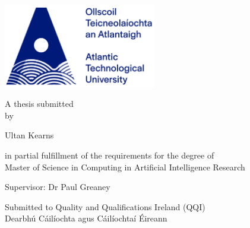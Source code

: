 \documentclass[a4paper,11pt]{report}
\begin{document}
\begin{titlepage}
    \begin{center}

    \vspace{30pt}
    \includegraphics[width=0.5\textwidth]{figures/ATULogo.png}\\
    \vspace{50pt}
    
    \fontsize{14}{20} \selectfont
    \vspace{20pt}
    
    A thesis submitted \\
    by\\
    \vspace{10pt}
    
    {\huge Ultan Kearns}\\
    \vspace{10pt}
    
     in partial fulfillment of the requirements for the degree of\\ Master of Science in Computing in Artificial Intelligence Research
    \vspace{20pt}

    
    
    Supervisor: Dr Paul Greaney
    \vspace{30pt}
    
    
Submitted to Quality and Qualifications Ireland (QQI) \\
Dearbhú Cáilíochta agus Cáilíochtaí Éireann
    \centerline{\monthname \quad \the\year}
\end{center}    
\end{titlepage}

\onehalfspace


\setcounter{page}{1}

\setcounter{tocdepth}{2}

\tableofcontents
{}
\end{document}
